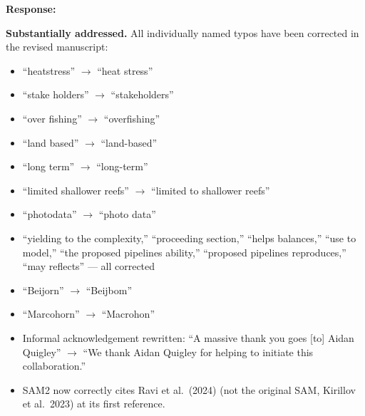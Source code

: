 \documentclass[12pt]{article}
\newenvironment{response}{%
  \vspace{4pt}%
  \color{respblue}%
  \noindent\textbf{Response:}\space
}{%
  \vspace{10pt}%
}
\begin{document}
\begin{response}
\textbf{Substantially addressed.}  All individually named typos have been
corrected in the revised manuscript:

\begin{itemize}[topsep=2pt,itemsep=1pt]
  \item ``heatstress'' $\to$ ``heat stress''
  \item ``stake holders'' $\to$ ``stakeholders''
  \item ``over fishing'' $\to$ ``overfishing''
  \item ``land based'' $\to$ ``land-based''
  \item ``long term'' $\to$ ``long-term''
  \item ``limited shallower reefs'' $\to$ ``limited to shallower reefs''
  \item ``photodata'' $\to$ ``photo data''
  \item ``yielding to the complexity,'' ``proceeding section,''
    ``helps balances,'' ``use to model,'' ``the proposed pipelines ability,''
    ``proposed pipelines reproduces,'' ``may reflects'' --- all corrected
  \item ``Beijorn'' $\to$ ``Beijbom''
  \item ``Marcohorn'' $\to$ ``Macrohon''
  \item Informal acknowledgement rewritten: ``A massive thank you goes [to]
    Aidan Quigley'' $\to$ ``We thank Aidan Quigley for helping to initiate
    this collaboration.''
  \item SAM2 now correctly cites Ravi et al.\ (2024) (not the original SAM,
    Kirillov et al.\ 2023) at its first reference.
\end{itemize}
\end{response}



\end{document}
